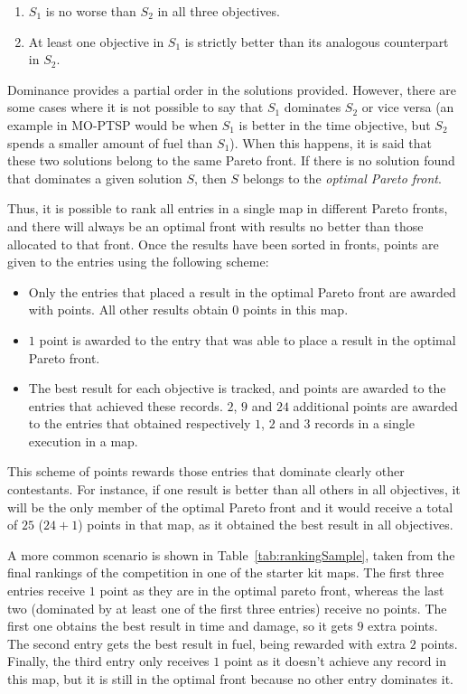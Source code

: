 \documentclass[conference]{IEEEtran}
\begin{document}
\begin{enumerate}
\item $S_1$ is no worse than $S_2$ in all three objectives.
\item At least one objective in $S_1$ is strictly better than its analogous counterpart in $S_2$.
\end{enumerate}

Dominance provides a partial order in the solutions provided. However, there are some cases where it is not possible to say that $S_1$ dominates $S_2$ or vice versa (an example in MO-PTSP would be when $S_1$ is better in the time objective, but $S_2$ spends a smaller amount of fuel than $S_1$). When this happens, it is said that these two solutions belong to the same Pareto front. If there is no solution found that dominates a given solution $S$, then $S$ belongs to the \textit{optimal Pareto front}.

Thus, it is possible to rank all entries in a single map in different Pareto fronts, and there will always be an optimal front with results no better than those allocated to that front. Once the results have been sorted in fronts, points are given to the entries using the following scheme:

\begin{itemize}
\item Only the entries that placed a result in the optimal Pareto front are awarded with points. All other results obtain $0$ points in this map.
\item $1$ point is awarded to the entry that was able to place a result in the optimal Pareto front.
\item The best result for each objective is tracked, and points are awarded to the entries that achieved these records. $2$, $9$ and $24$ additional points are awarded to the entries that obtained respectively $1$, $2$ and $3$ records in a single execution in a map.
\end{itemize}

This scheme of points rewards those entries that dominate clearly other contestants. For instance, if one result is better than all others in all objectives, it will be the only member of the optimal Pareto front and it would receive a total of $25$ ($24 + 1$) points in that map, as it obtained the best result in all objectives.

A more common scenario is shown in Table~\ref{tab:rankingSample}, taken from the final rankings of the competition in one of the starter kit maps. The first three entries receive $1$ point as they are in the optimal pareto front, whereas the last two (dominated by at least one of the first three entries) receive no points. The first one obtains the best result in time and damage, so it gets $9$ extra points. The second entry gets the best result in fuel, being rewarded with extra $2$ points. Finally, the third entry only receives $1$ point as it doesn't achieve any record in this map, but it is still in the optimal front because no other entry dominates it.
\end{document}
